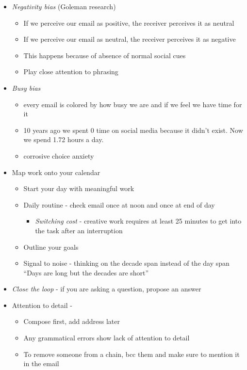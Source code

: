 \documentclass[
  letterpaper,
  DIV=11,
  numbers=noendperiod]{scrreprt}
\providecommand{\tightlist}{%
  \setlength{\itemsep}{0pt}\setlength{\parskip}{0pt}}\usepackage{longtable,booktabs,array}
\begin{document}
\begin{itemize}
\item
  \emph{Negativity bias} (Goleman research)

  \begin{itemize}
  \item
    If we perceive our email as positive, the receiver perceives it as
    neutral
  \item
    If we perceive our email as neutral, the receiver perceives it as
    negative
  \item
    This happens because of absence of normal social cues
  \item
    Play close attention to phrasing
  \end{itemize}
\item
  \emph{Busy bias}

  \begin{itemize}
  \item
    every email is colored by how busy we are and if we feel we have
    time for it
  \item
    10 years ago we spent 0 time on social media because it didn't
    exist. Now we spend 1.72 hours a day.
  \item
    corrosive choice anxiety
  \end{itemize}
\item
  Map work onto your calendar

  \begin{itemize}
  \item
    Start your day with meaningful work
  \item
    Daily routine - check email once at noon and once at end of day

    \begin{itemize}
    \tightlist
    \item
      \emph{Switching cost} - creative work requires at least 25 minutes
      to get into the task after an interruption
    \end{itemize}
  \item
    Outline your goals
  \item
    Signal to noise - thinking on the decade span instead of the day
    span ``Days are long but the decades are short''
  \end{itemize}
\item
  \emph{Close the loop} - if you are asking a question, propose an
  answer
\item
  Attention to detail -

  \begin{itemize}
  \item
    Compose first, add address later
  \item
    Any grammatical errors show lack of attention to detail
  \item
    To remove someone from a chain, bcc them and make sure to mention it
    in the email
  \end{itemize}
\end{itemize}
\end{document}
